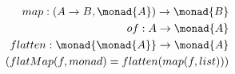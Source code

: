 \begin{align*}
  map: (A \to B, \monad{A}) \to \monad{B} \\
  of: A \to \monad{A} \\
  flatten: \monad{\monad{A}} \to \monad{A} \\
  (flatMap(f, monad) = flatten(map(f, list)))
\end{align*}
